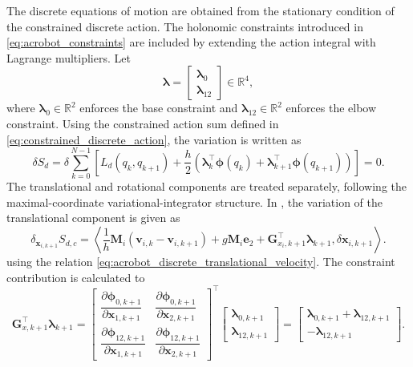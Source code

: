 The discrete equations of motion are obtained from the stationary condition of the
constrained discrete action. 
The holonomic constraints introduced in
\eqref{eq:acrobot_constraints} are included by extending the action integral with
Lagrange multipliers. Let
\begin{equation}
    \bm{\lambda}
    =
    \begin{bmatrix}
        \bm{\lambda}_{0} \\
        \bm{\lambda}_{12}
    \end{bmatrix}
    \in\mathbb{R}^{4},
    \label{eq:acrobot_lagrange_multipliers}
\end{equation}
where \(\bm{\lambda}_{0}\in\mathbb{R}^2\) enforces the base constraint and
\(\bm{\lambda}_{12}\in\mathbb{R}^2\) enforces the elbow constraint.
Using the constrained action sum defined in \eqref{eq:constrained_discrete_action}, the
variation is written as
\begin{equation}
    \delta S_{d}
    =
    \delta
    \sum_{k=0}^{N-1}
    \left[
    L_d(q_k,q_{k+1})
    +
    \frac{h}{2}
    \left(
    \bm{\lambda}_{k}^{\top}\bm{\phi}(q_k)
    +
    \bm{\lambda}_{k+1}^{\top}\bm{\phi}(q_{k+1})
    \right)
    \right]
    = 0.
    \label{eq:acrobot_variation_constrained_discrete_action}
\end{equation}
The translational and rotational components are treated separately, following the
maximal-coordinate variational-integrator structure. In \cite{BrudigamManchester2021VariationalIntegrators},
the variation of the translational component is given as
\begin{equation}
    \delta_{\bm{x}_{i,k+1}} S_{d,c}
    =
    \left\langle
    \frac{1}{h}\bm{M}_i
    \left(
    \bm{v}_{i,k}
    -
    \bm{v}_{i,k+1}
    \right)
    +
    g\bm{M}_i\bm{e}_2
    +
    \bm{G}_{x_i,k+1}^{\top}\bm{\lambda}_{k+1},
    \delta\bm{x}_{i,k+1}
    \right\rangle .
    \label{eq:acrobot_translational_variation}
\end{equation}
using the relation \eqref{eq:acrobot_discrete_translational_velocity}.
The constraint contribution is calculated to
\begin{equation}
    \bm{G}_{x,k+1}^{\top}\bm{\lambda}_{k+1}
    =
    \begin{bmatrix}
        \dfrac{\partial \bm{\phi}_{0,k+1}}{\partial \bm{x}_{1,k+1}}
        &
        \dfrac{\partial \bm{\phi}_{0,k+1}}{\partial \bm{x}_{2,k+1}}
        \\[0.8em]
        \dfrac{\partial \bm{\phi}_{12,k+1}}{\partial \bm{x}_{1,k+1}}
        &
        \dfrac{\partial \bm{\phi}_{12,k+1}}{\partial \bm{x}_{2,k+1}}
    \end{bmatrix}^{\top}
    \begin{bmatrix}
        \bm{\lambda}_{0,k+1} \\
        \bm{\lambda}_{12,k+1}
    \end{bmatrix}  
    =
    \begin{bmatrix}
        \bm{\lambda}_{0,k+1}+\bm{\lambda}_{12,k+1} \\
        -\bm{\lambda}_{12,k+1}
    \end{bmatrix}.
    \label{eq:acrobot_translational_constraint_force}
\end{equation}
